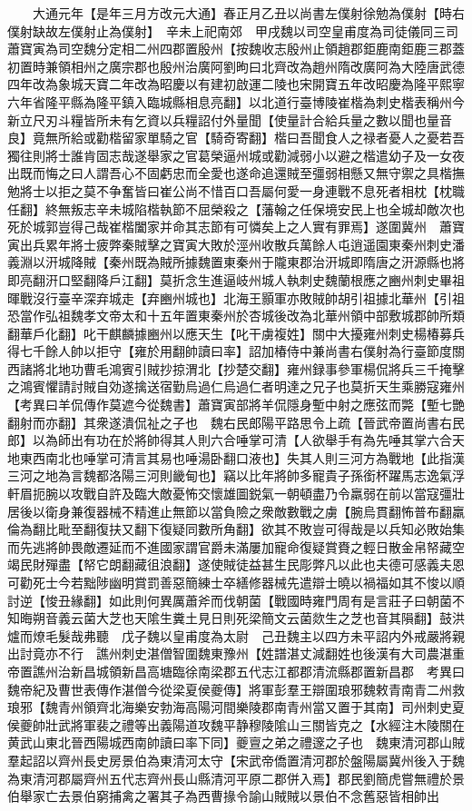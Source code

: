 　　大通元年【是年三月方改元大通】春正月乙丑以尚書左僕射徐勉為僕射【時右僕射缺故左僕射止為僕射】　辛未上祀南郊　甲戌魏以司空皇甫度為司徒儀同三司蕭寶寅為司空魏分定相二州四郡置殷州【按魏收志殷州止領趙郡鉅鹿南鉅鹿三郡蓋初置時兼領相州之廣宗郡也殷州治廣阿劉昫曰北齊改為趙州隋改廣阿為大陸唐武德四年改為象城天寶二年改為昭慶以有建初啟運二陵也宋開寶五年改昭慶為隆平熙寧六年省隆平縣為隆平鎮入臨城縣相息亮翻】以北道行臺博陵崔楷為刺史楷表稱州今新立尺刃斗糧皆所未有乞資以兵糧詔付外量聞【使量計合給兵量之數以聞也量音良】竟無所給或勸楷留家單騎之官【騎奇寄翻】楷曰吾聞食人之禄者憂人之憂若吾獨往則將士誰肯固志哉遂舉家之官葛榮逼州城或勸減弱小以避之楷遣幼子及一女夜出既而悔之曰人謂吾心不固虧忠而全愛也遂命追還賊至彊弱相懸又無守禦之具楷撫勉將士以拒之莫不争奮皆曰崔公尚不惜百口吾屬何愛一身連戰不息死者相枕【枕職任翻】終無叛志辛未城陷楷執節不屈榮殺之【藩翰之任保境安民上也全城却敵次也死於城郭豈得己哉崔楷闔家并命其志節有可憐矣上之人實有罪焉】遂圍冀州　蕭寶寅出兵累年將士疲弊秦賊擊之寶寅大敗於涇州收散兵萬餘人屯逍遥園東秦州刺史潘義淵以汧城降賊【秦州既為賊所據魏置東秦州于隴東郡治汧城即隋唐之汧源縣也將即亮翻汧口堅翻降戶江翻】莫折念生進逼岐州城人執刺史魏蘭根應之豳州刺史畢祖暉戰沒行臺辛深弃城走【弃豳州城也】北海王顥軍亦敗賊帥胡引祖據北華州【引祖恐當作弘祖魏孝文帝太和十五年置東秦州於杏城後改為北華州領中部敷城郡帥所類翻華戶化翻】叱干麒麟據豳州以應天生【叱干虜複姓】關中大擾雍州刺史楊椿募兵得七千餘人帥以拒守【雍於用翻帥讀曰率】詔加椿侍中兼尚書右僕射為行臺節度關西諸將北地功曹毛鴻賓引賊抄掠渭北【抄楚交翻】雍州録事參軍楊侃將兵三千掩擊之鴻賓懼請討賊自効遂擒送宿勤烏過仁烏過仁者明達之兄子也莫折天生乘勝寇雍州　【考異曰羊侃傳作莫遮今從魏書】蕭寶寅部將羊侃隱身塹中射之應弦而斃【塹七艷翻射而亦翻】其衆遂潰侃祉之子也　魏右民郎陽平路思令上疏【晉武帝置尚書右民郎】以為師出有功在於將帥得其人則六合唾掌可清【人欲舉手有為先唾其掌六合天地東西南北也唾掌可清言其易也唾湯卧翻口液也】失其人則三河方為戰地【此指漢三河之地為言魏都洛陽三河則畿甸也】竊以比年將帥多寵貴子孫銜杯躍馬志逸氣浮軒眉扼腕以攻戰自許及臨大敵憂怖交懷雄圖鋭氣一朝頓盡乃令羸弱在前以當寇彊壯居後以衛身兼復器械不精進止無節以當負險之衆敵數戰之虜【腕烏貫翻怖普布翻羸倫為翻比毗至翻復扶又翻下復疑同數所角翻】欲其不敗豈可得哉是以兵知必敗始集而先逃將帥畏敵遷延而不進國家謂官爵未滿屢加寵命復疑賞賚之輕日散金帛帑藏空竭民財殫盡【帑它朗翻藏徂浪翻】遂使賊徒益甚生民彫弊凡以此也夫德可感義夫恩可勸死士今若黜陟幽明賞罰善惡簡練士卒繕修器械先遣辯士曉以禍福如其不悛以順討逆【悛丑緣翻】如此則何異厲蕭斧而伐朝菌【戰國時雍門周有是言莊子曰朝菌不知晦朔音義云菌大芝也天隂生糞土見日則死梁簡文云菌欻生之芝也音其隕翻】鼓洪爐而燎毛髮哉弗聽　戊子魏以皇甫度為太尉　己丑魏主以四方未平詔内外戒嚴將親出討竟亦不行　譙州刺史湛僧智圍魏東豫州【姓譜湛丈減翻姓也後漢有大司農湛重帝置譙州治新昌城領新昌高塘臨徐南梁郡五代志江都郡清流縣郡置新昌郡　考異曰魏帝紀及曹世表傳作湛僧今從梁夏侯夔傳】將軍彭羣王辯圍琅邪魏敕青南青二州救琅邪【魏青州領齊北海樂安勃海高陽河間樂陵郡南青州當又置于其南】司州刺史夏侯夔帥壯武將軍裴之禮等出義陽道攻魏平静穆陵隂山三關皆克之【水經注木陵關在黄武山東北晉西陽城西南帥讀曰率下同】夔亶之弟之禮邃之子也　魏東清河郡山賊羣起詔以齊州長史房景伯為東清河太守【宋武帝僑置清河郡於盤陽屬冀州後入于魏為東清河郡屬齊州五代志齊州長山縣清河平原二郡併入焉】郡民劉簡虎嘗無禮於景伯舉家亡去景伯窮捕禽之署其子為西曹掾令諭山賊賊以景伯不念舊惡皆相帥出